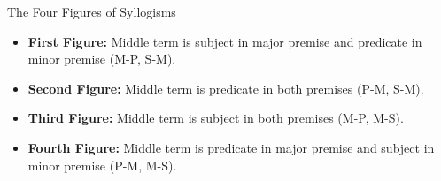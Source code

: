 \documentclass{beamer}
\begin{document}
	\begin{frame}{The Four Figures of Syllogisms}
		\begin{itemize}
			\item \textbf{First Figure:} Middle term is subject in major premise and predicate in minor premise (M-P, S-M).
			\item \textbf{Second Figure:} Middle term is predicate in both premises (P-M, S-M).
			\item \textbf{Third Figure:} Middle term is subject in both premises (M-P, M-S).
			\item \textbf{Fourth Figure:} Middle term is predicate in major premise and subject in minor premise (P-M, M-S).
		\end{itemize}
		
		\begin{center}
		\end{center}
	\end{frame}
	
\end{document}
